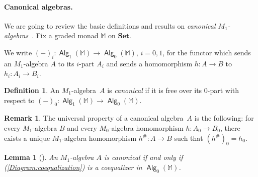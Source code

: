 \documentclass[sigconf,
			final%
			nonacm
                        ]{acmart}
\newcommand{\resetCurThmBraces}{%
\gdef\curThmBraceOpen{(}%
\gdef\curThmBraceClose{)}}
\newcommand{\removeThmBraces}{%
\gdef\curThmBraceOpen{}%
\gdef\curThmBraceClose{}}
\newenvironment{notheorembrackets}{\removeThmBraces}{\resetCurThmBraces}
\numberwithin{equation}{section}
\numberwithin{equation}{section}
\theoremstyle{plain}
\newtheorem{lem}[thm]{Lemma}
\newtheorem{propn}[thm]{Proposition}
\theoremstyle{definition}
\newtheorem{defn}[thm]{Definition}
\newtheorem{rem}[thm]{Remark}
\newcommand{\M}{\mathbb{M}}                   %
\newcommand{\Set}{\mathbf{Set}}
\DeclareMathOperator{\Alg}{\mathsf{Alg}}
\begin{document}

\paragraph*{Canonical algebras.}
We are going to review the basic definitions and results on
\emph{canonical $M_1$-algebras}~\cite{DMS19}. Fix a graded
monad $\M$ on $\Set$.

We write $(-)_i\colon\Alg_1(\M)\to\Alg_0(\M)$, $i = 0,1$,
for the functor which sends an $M_1$-algebra $A$ to its $i$-part
$A_i$ and sends a homomorphism $h\colon A\to B$ to
$h_i\colon A_i\to B_i$.

\begin{defn}\label{D:canonical}
An $M_1$-algebra~$A$ is \emph{canonical} if it is free over its
$0$-part with respect to $(-)_0\colon\Alg_1(\M)\to\Alg_0(\M)$.
\end{defn}

\begin{rem}\label{rem:canonical}
  The universal property of a canonical algebra~$A$ is the following:
  for every $M_1$-algebra $B$ and every $M_0$-algebra homomorphism
  $h\colon A_0\to B_0$, there exists a unique $M_1$-algebra
  homomorphism $h^\#\colon A\to B$ such that $(h^{\#})_0 = h_0$.
\end{rem}

\begin{notheorembrackets}
\begin{lem}[{\cite[Lem.~5.3]{DMS19}}]\label{L:canonical-algebra}
An $M_1$-algebra $A$ is canonical if and only if
  (\ref{Diagram:coequalization}) is a coequalizer in $\Alg_0(\M)$.
\end{lem}
\end{notheorembrackets}
\end{document}
